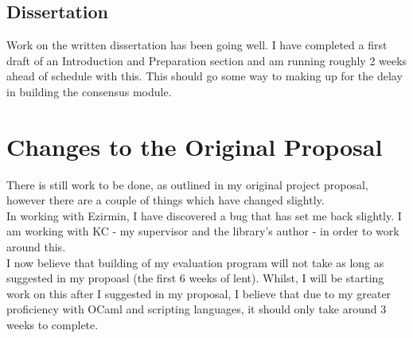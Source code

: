 \documentclass[12pt]{article}
\begin{document}
\subsection*{Dissertation}
Work on the written dissertation has been going well. 
I have completed a first draft of an Introduction and Preparation section and am running roughly 2 weeks ahead of schedule with this.
This should go some way to making up for the delay in building the consensus module.
\section{Changes to the Original Proposal}
There is still work to be done, as outlined in my original project proposal, however there are a couple of things which have changed slightly.\\
In working with Ezirmin, I have discovered a bug that has set me back slightly. I am working with KC - my supervisor and the library's author - in order to work around this.\\
I now believe that building of my evaluation program will not take as long as suggested in my propoasl (the first 6 weeks of lent).
Whilst, I will be starting work on this after I suggested in my proposal, I believe that due to my greater proficiency with OCaml and scripting languages, it should only take around 3 weeks to complete.  
\end{document}
